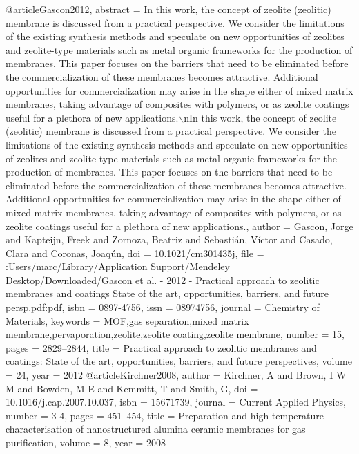@article{Gascon2012,
abstract = {In this work, the concept of zeolite (zeolitic) membrane is discussed from a practical perspective. We consider the limitations of the existing synthesis methods and speculate on new opportunities of zeolites and zeolite-type materials such as metal organic frameworks for the production of membranes. This paper focuses on the barriers that need to be eliminated before the commercialization of these membranes becomes attractive. Additional opportunities for commercialization may arise in the shape either of mixed matrix membranes, taking advantage of composites with polymers, or as zeolite coatings useful for a plethora of new applications.$\backslash$nIn this work, the concept of zeolite (zeolitic) membrane is discussed from a practical perspective. We consider the limitations of the existing synthesis methods and speculate on new opportunities of zeolites and zeolite-type materials such as metal organic frameworks for the production of membranes. This paper focuses on the barriers that need to be eliminated before the commercialization of these membranes becomes attractive. Additional opportunities for commercialization may arise in the shape either of mixed matrix membranes, taking advantage of composites with polymers, or as zeolite coatings useful for a plethora of new applications.},
author = {Gascon, Jorge and Kapteijn, Freek and Zornoza, Beatriz and Sebasti{\'{a}}n, V{\'{i}}ctor and Casado, Clara and Coronas, Joaq{\'{u}}n},
doi = {10.1021/cm301435j},
file = {:Users/marc/Library/Application Support/Mendeley Desktop/Downloaded/Gascon et al. - 2012 - Practical approach to zeolitic membranes and coatings State of the art, opportunities, barriers, and future persp.pdf:pdf},
isbn = {0897-4756},
issn = {08974756},
journal = {Chemistry of Materials},
keywords = {MOF,gas separation,mixed matrix membrane,pervaporation,zeolite,zeolite coating,zeolite membrane},
number = {15},
pages = {2829--2844},
title = {{Practical approach to zeolitic membranes and coatings: State of the art, opportunities, barriers, and future perspectives}},
volume = {24},
year = {2012}
}
@article{Kirchner2008,
author = {Kirchner, A and Brown, I W M and Bowden, M E and Kemmitt, T and Smith, G},
doi = {10.1016/j.cap.2007.10.037},
isbn = {15671739},
journal = {Current Applied Physics},
number = {3-4},
pages = {451--454},
title = {{Preparation and high-temperature characterisation of nanostructured alumina ceramic membranes for gas purification}},
volume = {8},
year = {2008}
}
